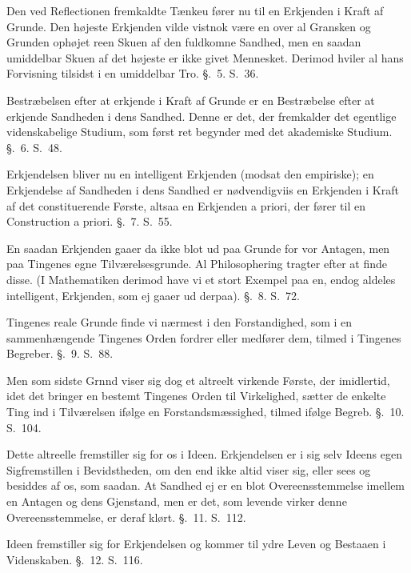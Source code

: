 \documentclass[12pt,a4paper]{book}
\newcommand{\opage}[1]{\marginnote{\footnotesize\textit{[#1]}}}
\begin{document}
Den ved Reflectionen fremkaldte Tænkeu fører nu til en Erkjenden i Kraft af
Grunde. Den højeste Erkjenden vilde vistnok være en over al Gransken og
Grunden ophøjet reen Skuen af den fuldkomne Sandhed, men en saadan umiddelbar
Skuen af det højeste er ikke givet Mennesket. Derimod hviler al hans
Forvisning tilsidst i en umiddelbar Tro. §.~5. S.~36.

\opage{XIV} Bestræbelsen efter at erkjende i Kraft af Grunde er en Bestræbelse efter at
erkjende Sandheden i dens Sandhed. Denne er det, der fremkalder det egentlige
videnskabelige Studium, som først ret begynder med det akademiske Studium.
§.~6. S.~48.

Erkjendelsen bliver nu en intelligent Erkjenden (modsat den empiriske); en
Erkjendelse af Sandheden i dens Sandhed er nødvendigviis en Erkjenden i Kraft
af det constituerende Første, altsaa en Erkjenden a priori, der fører til en
Construction a priori. §.~7. S.~55.

En saadan Erkjenden gaaer da ikke blot ud paa Grunde for vor Antagen, men paa
Tingenes egne Tilværelsesgrunde. Al Philosophering tragter efter at finde
disse. (I Mathematiken derimod have vi et stort Exempel paa en, endog aldeles
intelligent, Erkjenden, som ej gaaer ud derpaa). §.~8. S.~72.

Tingenes reale Grunde finde vi nærmest i den Forstandighed, som i en
sammenhængende Tingenes Orden fordrer eller medfører dem, tilmed i Tingenes
Begreber. §.~9. S.~88.

Men som sidste Grnnd viser sig dog et altreelt virkende Første, der
imidlertid, idet det bringer en bestemt Tingenes Orden til Virkelighed,
sætter de enkelte Ting ind i Tilværelsen ifølge en Forstandsmæssighed, tilmed
ifølge Begreb. §.~10. S.~104.

Dette altreelle fremstiller sig for os i Ideen. Erkjendelsen er i sig selv
Ideens egen Sigfremstillen i Bevidstheden, om den end ikke altid viser sig,
eller sees og besiddes af os, som saadan. At Sandhed ej er en blot
Overeensstemmelse imellem en Antagen og dens Gjenstand, men er det, som
levende virker denne Overeensstemmelse, er deraf klørt. §.~11. S.~112.

Ideen fremstiller sig for Erkjendelsen og kommer til ydre Leven og Bestaaen i
Videnskaben. §.~12. S.~116.
\end{document}
